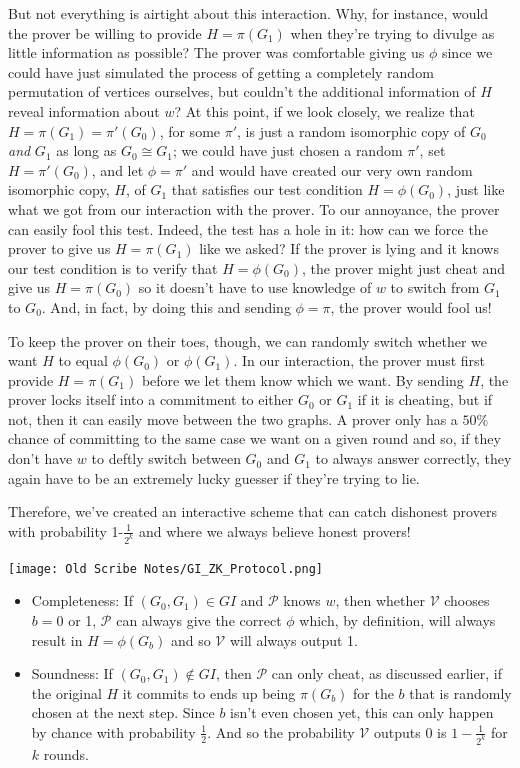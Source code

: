 \documentclass[12pt]{tufte-book}
\begin{document}
	But not everything is airtight about this interaction.  Why, for instance, would the prover be willing to provide $H=\pi(G_1)$ when they're trying to divulge as little information as possible?  The prover was comfortable giving us $\phi$ since we could have just simulated the process of getting a completely random permutation of vertices ourselves, but couldn't the additional information of $H$ reveal information about $w$?  At this point, if we look closely, we realize that $H=\pi(G_1)=\pi'(G_0)$, for some $\pi'$, is just a random isomorphic copy of $G_0$ \textit{and} $G_1$ as long as $G_0 \cong G_1$; we could have just chosen a random $\pi'$, set $H=\pi'(G_0)$, and let $\phi=\pi'$ and would have created our very own random isomorphic copy, $H$, of $G_1$ that satisfies our test condition $H=\phi(G_0)$, just like what we got from our interaction with the prover. To our annoyance, the prover can easily fool this test. Indeed, the test has a hole in it: how can we force the prover to give us $H=\pi(G_1)$ like we asked?  If the prover is lying and it knows our test condition is to verify that $H=\phi(G_0)$, the prover might just cheat and give us $H=\pi(G_0)$ so it doesn't have to use knowledge of $w$ to switch from $G_1$ to $G_0$.  And, in fact, by doing this and sending $\phi=\pi$, the prover would fool us!

	To keep the prover on their toes, though, we can randomly switch whether we want $H$ to equal $\phi(G_0)$ or $\phi(G_1)$.  In our interaction, the prover must first provide $H=\pi(G_1)$ before we let them know which we want. By sending $H$, the prover locks itself into a commitment to either $G_0$ or $G_1$ if it is cheating, but if not, then it can easily move between the two graphs. A prover only has a $50\%$ chance of committing to the same case we want on a given round and so, if they don't have $w$ to deftly switch between $G_0$ and $G_1$ to always answer correctly, they again have to be an extremely lucky guesser if they're trying to lie.

	Therefore, we've created an interactive scheme that can catch dishonest provers with probability 1-$\frac{1}{2^k}$ and where we always believe honest provers!

		\begin{center}
			\texttt{[image: Old Scribe Notes/GI\_ZK\_Protocol.png]}
		\end{center}

		\begin{itemize}
			\item Completeness: If $(G_0,G_1)\in GI$ and $\mathcal{P}$ knows $w$, then whether $\mathcal{V}$ chooses $b=0$ or 1, $\mathcal{P}$ can always give the correct $\phi$ which, by definition, will always result in $H=\phi(G_b)$ and so $\mathcal{V}$ will always output 1.
			\item Soundness: If $(G_0,G_1)\notin GI$, then $\mathcal{P}$ can only cheat, as discussed earlier, if the original $H$ it commits to ends up being $\pi(G_b)$ for the $b$ that is randomly chosen at the next step.  Since $b$ isn't even chosen yet, this can only happen by chance with probability $\frac{1}{2}$.  And so the probability $\mathcal{V}$ outputs $0$ is $1-\frac{1}{2^k}$ for $k$ rounds.
		\end{itemize}
\end{document}
